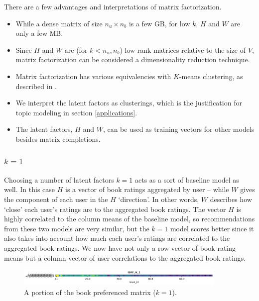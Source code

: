 \documentclass[11pt]{article}
\begin{document}
There are a few advantages and interpretations of matrix factorization.
\begin{itemize}
\item While a dense matrix of size $n_u \times n_b$ is a few GB, for low $k$, $H$ and $W$ are only a few MB.
\item Since $H$ and $W$ are (for $k < n_u, n_b$) low-rank matrices relative to the size of $V$, matrix factorization
can be considered a dimensionality reduction technique.
\item Matrix factorization has various equivalencies with $K$-means clustering, as described in \cite{dingEquivalenceNonnegativeMatrix2005}.
\item We interpret the latent factors as clusterings, which is the justification for topic modeling in section \ref{applications}.
\item The latent factors, $H$ and $W$, can be used as training vectors for other models besides matrix completions.
\end{itemize}








    \hypertarget{k1}{%
\subsubsection{\texorpdfstring{\(k=1\)}{k=1}}\label{k1}}




Choosing a number of latent factors \(k=1\) acts as a sort of baseline
model as well. In this case \(H\) is a vector of book ratings aggregated
by user -- while \(W\) gives the component of each user in the \(H\)
`direction'. In other words, \(W\) describes how `close' each user's
ratings are to the aggregated book ratings. The vector \(H\) is highly
correlated to the column means of the baseline model, so recommendations
from these two models are very similar, but the \(k=1\) model scores
better since it also takes into account how much each user's ratings are
correlated to the aggregated book ratings. We now have not only a row
vector of book rating means but a column vector of user correlations to
the aggregated book ratings.


\begin{figure}[b]
    \includegraphics[width=0.9\textwidth, trim=4cm 0cm 0cm 0cm, clip]{../image/goodreads-models/nmf-H-1.png}
    \caption[NMF-H-1]{A portion of the book preferenced matrix ($k=1$).}
     \label{fig:nmf-H-1}
\end{figure}
\end{document}
